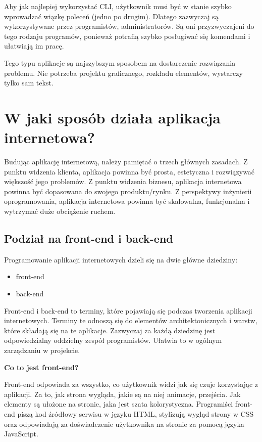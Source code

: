 Aby jak najlepiej wykorzystać CLI, użytkownik musi być w stanie szybko wprowadzać wiązkę poleceń (jedno po drugim). Dlatego zazwyczaj są wykorzystywane przez programistów, administratorów. Są oni przyzwyczajeni do tego rodzaju programów, ponieważ potrafią szybko posługiwać się komendami i ułatwiają im pracę.

Tego typu aplikacje są najszybszym sposobem na dostarczenie rozwiązania problemu. Nie potrzeba projektu graficznego, rozkładu elementów, wystarczy tylko sam tekst.


\section{W jaki sposób działa aplikacja internetowa?}

Budując aplikację internetową, należy pamiętać o trzech głównych zasadach. Z punktu widzenia klienta, aplikacja powinna być prosta, estetyczna i rozwiązywać większość jego problemów. Z punktu widzenia biznesu, aplikacja internetowa powinna być dopasowana do swojego produktu/rynku. Z perspektywy inżynierii oprogramowania, aplikacja internetowa powinna być skalowalna, funkcjonalna i wytrzymać duże obciążenie ruchem.

\subsection{Podział na front-end i back-end}
Programowanie aplikacji internetowych dzieli się na dwie główne dziedziny:
\begin{itemize}
    \item front-end
    \item back-end
\end{itemize}

Front-end i back-end to terminy, które pojawiają się podczas tworzenia aplikacji internetowych. Terminy te odnoszą się do elementów architektonicznych i warstw, które składają się na te aplikacje. Zazwyczaj za każdą dziedzinę jest odpowiedzialny oddzielny zespół programistów. Ułatwia to w ogólnym zarządzaniu w projekcie.

\textbf{Co to jest front-end?}

Front-end odpowiada za wszystko, co użytkownik widzi jak się czuje korzystając z aplikacji. Za to, jak strona wygląda, jakie są na niej animacje, przejścia. Jak elementy są ułożone na stronie, jaka jest szata kolorystyczna. Programiści front-end piszą kod źródłowy serwisu w języku HTML, stylizują wygląd strony w CSS oraz odpowiadają za doświadczenie użytkownika na stronie za pomocą języka JavaScript.


